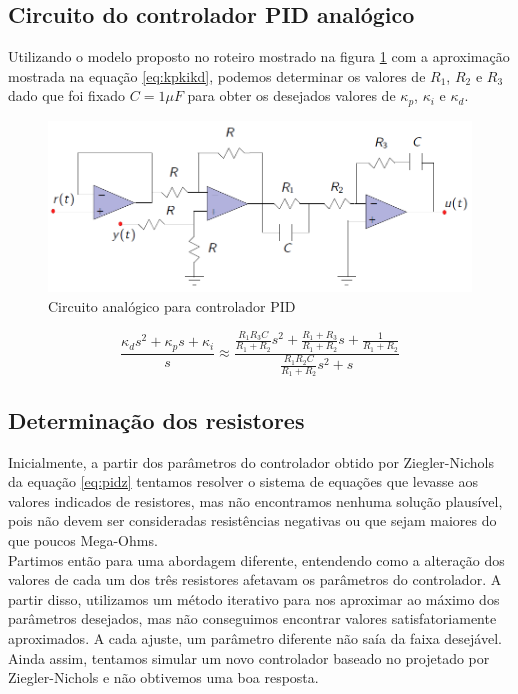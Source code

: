 \documentclass{article}
\begin{document}
\subsection{Circuito do controlador PID analógico}
Utilizando o modelo proposto no roteiro \cite{bb:roteiro} mostrado na figura \ref{fig:circuito} com a aproximação mostrada na equação \ref{eq:kpkikd}, podemos determinar os valores de $R_1$, $R_2$ e $R_3$ dado que foi fixado $C=1 \mu F$ para obter os desejados valores de $\kappa_p$, $\kappa_i$ e $\kappa_d$.

\begin{figure}[H]
	\centering
	\includegraphics[width=\linewidth]{circuito}
	\caption{Circuito analógico para controlador PID}
	\label{fig:circuito}
\end{figure}

\begin{equation}
\label{eq:kpkikd}
\frac{\kappa_d s^2+\kappa_p s+\kappa_i}{s} \approx \frac{\frac{R_1 R_3 C}{R_1 + R_2} s^2 + \frac{R_1 + R_3}{R_1 + R_2} s+\frac{1}{R_1 + R_2}}{\frac{R_1 R_2 C}{R_1 + R_2}s^2 +s} 
\end{equation}

\subsection{Determinação dos resistores}
Inicialmente, a partir dos parâmetros do controlador obtido por Ziegler-Nichols da equação \ref{eq:pidz} tentamos resolver o sistema de equações que levasse aos valores indicados de resistores, mas não encontramos nenhuma solução plausível, pois não devem ser consideradas resistências negativas ou que sejam maiores do que poucos Mega-Ohms. \\

Partimos então para uma abordagem diferente, entendendo como a alteração dos valores de cada um dos três resistores afetavam os parâmetros do controlador. A partir disso, utilizamos um método iterativo para nos aproximar ao máximo dos parâmetros desejados, mas não conseguimos encontrar valores satisfatoriamente aproximados. A cada ajuste, um parâmetro diferente não saía da faixa desejável. Ainda assim, tentamos simular um novo controlador baseado no projetado por Ziegler-Nichols e não obtivemos uma boa resposta.\\
\end{document}
